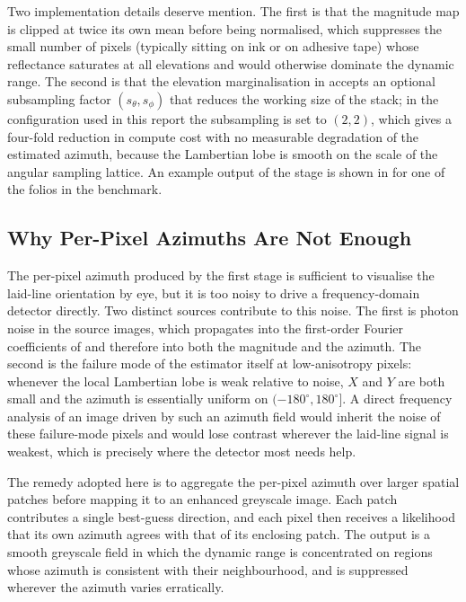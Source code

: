 Two implementation details deserve mention. The first is that the
magnitude map is clipped at twice its own mean before being
normalised, which suppresses the small number of pixels (typically
sitting on ink or on adhesive tape) whose reflectance saturates at
all elevations and would otherwise dominate the dynamic range. The
second is that the elevation marginalisation in
 accepts an optional subsampling factor
$(s_\theta, s_\phi)$ that reduces the working size of the stack;
in the configuration used in this report the subsampling is set to
$(2, 2)$, which gives a four-fold reduction in compute cost with no
measurable degradation of the estimated azimuth, because the
Lambertian lobe is smooth on the scale of the angular sampling
lattice. An example output of the stage is shown in
 for one of the folios in the benchmark.

\subsection{Why Per-Pixel Azimuths Are Not Enough}
\label{sec:direction:noisy}

The per-pixel azimuth produced by the first stage is sufficient to
visualise the laid-line orientation by eye, but it is too noisy to
drive a frequency-domain detector directly. Two distinct sources
contribute to this noise. The first is photon noise in the source
images, which propagates into the first-order Fourier coefficients
of  and therefore into both the magnitude and
the azimuth. The second is the failure mode of the estimator itself
at low-anisotropy pixels: whenever the local Lambertian lobe is weak
relative to noise, $X$ and $Y$ are both small and the azimuth is
essentially uniform on $(-180^\circ, 180^\circ]$. A direct frequency
analysis of an image driven by such an azimuth field would inherit
the noise of these failure-mode pixels and would lose contrast
wherever the laid-line signal is weakest, which is precisely where
the detector most needs help.

The remedy adopted here is to aggregate the per-pixel azimuth over
larger spatial patches before mapping it to an enhanced greyscale
image. Each patch contributes a single best-guess direction, and
each pixel then receives a likelihood that its own azimuth agrees
with that of its enclosing patch. The output is a smooth greyscale
field in which the dynamic range is concentrated on regions whose
azimuth is consistent with their neighbourhood, and is suppressed
wherever the azimuth varies erratically.


